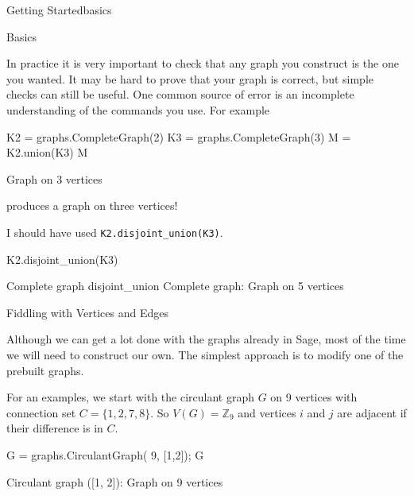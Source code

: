 \begin{chap}{Getting Started}{basics}
\begin{sect}{Basics}
\begin{para}
In practice it is very important to check that any graph you construct is
the one you wanted.  It may be hard to prove that your graph is correct,
but simple checks can still be useful. One common source of error is an incomplete
understanding of the commands you use.  For example
\end{para}
%
\begin{sagecode}
\begin{sageinput}
K2 = graphs.CompleteGraph(2)
K3 = graphs.CompleteGraph(3)
M = K2.union(K3)
M
\end{sageinput}
\begin{sageoutput}
Graph on 3 vertices
\end{sageoutput}
\end{sagecode}
%
\begin{para}
produces a graph on three vertices!
\end{para}
%
\begin{para}
I should have used \verb|K2.disjoint_union(K3)|.
\end{para}
%
\begin{sagecode}
\begin{sageinput}
K2.disjoint_union(K3)
\end{sageinput}
\begin{sageoutput}
Complete graph disjoint_union Complete graph: Graph on 5 vertices
\end{sageoutput}
\end{sagecode}
%
\end{sect}
%
\begin{sect}{Fiddling with Vertices and Edges}
%
\begin{para}
Although we can get a lot done with the graphs already in Sage, most of the time
we will need to construct our own. The simplest approach is to modify one of 
the prebuilt graphs.
\end{para}
%
\begin{para}
For an examples, we start with the circulant graph $G$ on 9 vertices
with connection set $C=\{1,2,7,8\}$. So $V(G)=\mathbb{Z}_9$ and
vertices $i$ and $j$ are adjacent if their difference is in $C$.
\end{para}
%
\begin{sagecode}
\begin{sageinput}
G = graphs.CirculantGraph( 9, [1,2]); G
\end{sageinput}
\begin{sageoutput}
Circulant graph ([1, 2]): Graph on 9 vertices
\end{sageoutput}

\end{sagecode}
\end{sect}
\end{chap}
